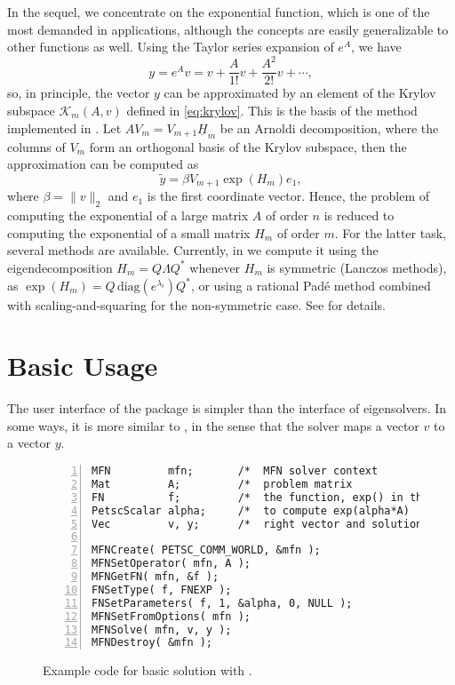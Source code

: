 In the sequel, we concentrate on the exponential function, which is one of the most demanded in applications, although the concepts are easily generalizable to other functions as well. Using the Taylor series expansion of $e^A$, we have
\begin{equation}
y=e^Av=v+\frac{A}{1!}v+\frac{A^2}{2!}v+\cdots,
\end{equation}
so, in principle, the vector $y$ can be approximated by an element of the Krylov subspace $\mathcal{K}_m(A,v)$ defined in \eqref{eq:krylov}. This is the basis of the method implemented in \expokit \citep{Sidje:1998:ESP}. Let $AV_m=V_{m+1}\underline{H}_m$ be an Arnoldi decomposition, where the columns of $V_m$ form an orthogonal basis of the Krylov subspace, then the approximation can be computed as
\begin{equation}
\tilde y=\beta V_{m+1}\exp(H_m)e_1,
\end{equation}
where $\beta=\|v\|_2$ and $e_1$ is the first coordinate vector. Hence, the problem of computing the exponential of a large matrix $A$ of order $n$ is reduced to computing the exponential of a small matrix $H_m$ of order $m$. For the latter task, several methods are available. Currently, in \slepc we compute it using the eigendecomposition $H_m=Q\Lambda Q^*$ whenever $H_m$ is symmetric (Lanczos methods), as $\exp(H_m)=Q\,\mathrm{diag}(e^{\lambda_i})Q^*$, or using a rational Pad\'e method combined with scaling-and-squaring for the non-symmetric case. See \citep{Higham:2010:CMF} for details.

\section{Basic Usage}

The user interface of the  package is simpler than the interface of eigensolvers. In some ways, it is more similar to , in the sense that the solver maps a vector $v$ to a vector $y$. 

\begin{figure}
\begin{Verbatim}[fontsize=\small,numbers=left,numbersep=6pt,xleftmargin=15mm]
MFN         mfn;       /*  MFN solver context                  */
Mat         A;         /*  problem matrix                      */
FN          f;         /*  the function, exp() in this example */
PetscScalar alpha;     /*  to compute exp(alpha*A)             */
Vec         v, y;      /*  right vector and solution           */

MFNCreate( PETSC_COMM_WORLD, &mfn );
MFNSetOperator( mfn, A );
MFNGetFN( mfn, &f );
FNSetType( f, FNEXP );
FNSetParameters( f, 1, &alpha, 0, NULL );
MFNSetFromOptions( mfn );
MFNSolve( mfn, v, y );
MFNDestroy( &mfn );
\end{Verbatim}
\caption{\label{fig:ex-mfn}Example code for basic solution with .}
\end{figure}

